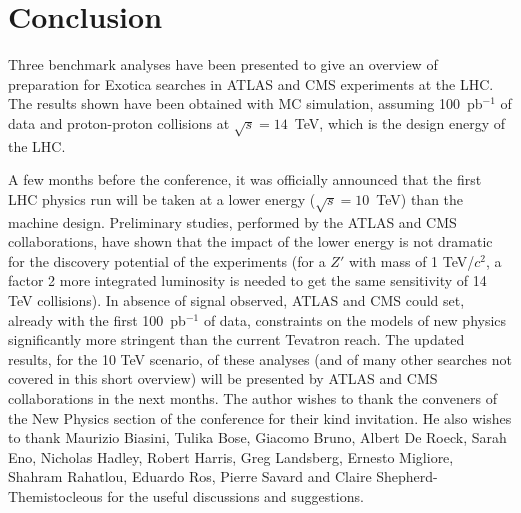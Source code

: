 \documentclass{cimento}
\begin{document}
\section{Conclusion} \label{Conclusion}
Three benchmark analyses have been presented to give an
overview of preparation for Exotica searches in ATLAS and CMS 
experiments at the LHC. The results shown have been obtained with 
MC simulation, assuming 100~pb$^{-1}$ of data and proton-proton collisions
at $\sqrt{s} = 14$~TeV, which is the design energy of the LHC.

A few months before the conference, it was officially announced 
that the first LHC physics run will be taken at a lower energy 
($\sqrt{s} = 10$~TeV) than the machine design. Preliminary 
studies, performed by the ATLAS and CMS collaborations, 
have shown that the impact of the lower energy is not dramatic for the 
discovery potential of the experiments (for a $Z'$ with mass of 1 TeV/$c^2$, 
a factor 2 more integrated luminosity is needed to get the same 
sensitivity of 14 TeV collisions). 
In absence of signal observed, ATLAS and CMS could set, already with the 
first 100~pb$^{-1}$ of data, constraints on the models of new physics 
significantly more stringent than the current Tevatron reach. 
The updated results, for the 10 TeV scenario, of these analyses (and of 
many other searches not covered in this short overview) 
will be presented by ATLAS and CMS collaborations 
in the next months.
%
%
\acknowledgments
The author wishes to thank the conveners of the New Physics 
section of the conference for their kind invitation. 
He also wishes to thank Maurizio Biasini, Tulika Bose, Giacomo Bruno, Albert De Roeck, Sarah Eno, Nicholas Hadley, Robert Harris, 
Greg Landsberg, Ernesto Migliore, Shahram Rahatlou, Eduardo Ros, Pierre Savard and Claire 
Shepherd-Themistocleous  for the useful discussions and suggestions.
%
\end{document}
